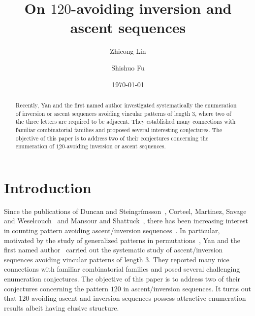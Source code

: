 \documentclass[12pt,A4]{amsart}
\numberwithin{equation}{section}
\theoremstyle{plain}
\theoremstyle{definition}
\begin{document}
\title[Patterns in inversion sequences]{On $\underline{12}0$-avoiding inversion and ascent sequences}



\author[Z. Lin]{Zhicong Lin}
\address[Zhicong Lin]{Research Center for Mathematics and Interdisciplinary Sciences, Shandong University, Qingdao 266237, P.R. China}

\author[S. Fu]{Shishuo Fu}
\address[Shishuo Fu]{College of Mathematics and Statistics, Chongqing University, Huxi campus, Chongqing 401331, P.R. China}



\date{\today}




\begin{abstract}
Recently, Yan and the first named author investigated systematically the enumeration of inversion or ascent sequences avoiding vincular patterns of length $3$, where two of the three letters are required to be adjacent. They established many connections with familiar combinatorial families and proposed several interesting conjectures. The objective of this paper is to address two of their conjectures concerning the enumeration of $\underline{12}0$-avoiding inversion or ascent sequences.
\end{abstract}



\maketitle
\section{Introduction}
Since the publications of Duncan and Steingr\'imsson~\cite{ds}, Corteel, Martinez, Savage and Weselcouch~\cite{cor} and Mansour and Shattuck~\cite{mash}, there has been increasing interest in counting pattern avoiding ascent/inversion sequences~\cite{auli,auli2,bp,bbgr,bgrr,cjl,cddds,kl,kl2,lin,lin2,ly,ms,yan0,yan}. In particular, motivated by the study of generalized patterns in permutations~\cite{bas,cla}, Yan and the first named author~\cite{ly} carried out the systematic study of ascent/inversion sequences avoiding vincular patterns of length $3$. They reported many nice connections with familiar combinatorial families and posed several challenging enumeration conjectures. The objective of this paper is to address two of their conjectures concerning the pattern $\underline{12}0$ in  ascent/inversion sequences. It turns out that  $\underline{12}0$-avoiding ascent and inversion sequences possess attractive enumeration results albeit having elusive structure.
\end{document}
